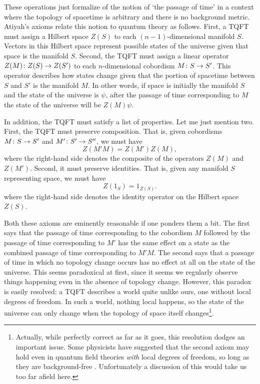 \documentclass[12pt,amsfonts]{article}
\begin{document}
These operations just formalize of the notion of `the passage of
time' in a context where the topology of spacetime is arbitrary and
there is no background metric.    Atiyah's axioms relate this notion to
quantum theory as follows.   First, a TQFT must assign a Hilbert space
$Z(S)$ to each $(n-1)$-dimensional manifold $S$.  Vectors in this
Hilbert space represent possible states of the universe given that space
is the  manifold $S$.  Second, the TQFT must assign a linear operator
$Z(M) \colon Z(S) \rightarrow Z(S')$ to each $n$-dimensional cobordism $M \colon S
\rightarrow S'$.  This operator describes how states change given that the
portion of spacetime between $S$ and $S'$ is the manifold $M$. In other
words, if space is initially the manifold $S$ and the state of  the
universe is $\psi$, after the passage of time corresponding to $M$ the
state of the universe will be $Z(M)\psi$.  

In addition, the TQFT must satisfy a list of properties.  Let me just
mention two.  First, the TQFT must preserve composition.  That is,
given cobordisms $M \colon S \rightarrow S'$ and $M' \colon S' \rightarrow S''$, we must
have 
\[                Z(M'M) = Z(M')Z(M),  \] 
where the right-hand side denotes the composite of the operators
$Z(M)$ and $Z(M')$.  Second, it must preserve identities.  That is, given
 any manifold $S$ representing space, we must have 
\[                Z(1_S) = 1_{Z(S)}  .\] 
where the right-hand side denotes the identity operator on the
Hilbert space $Z(S)$.   

Both these axioms are eminently reasonable if one ponders them a bit. 
The first says that the passage of time corresponding to the cobordism 
$M$ followed by the passage of time corresponding to $M'$ has the  same
effect on a state as the combined passage of time corresponding to
$M'M$.  The second says that a passage of time in which no topology 
change occurs has no effect at all on the state of the universe.  This
seems paradoxical at first, since it seems we regularly observe things 
happening even in the absence of topology change.   However, this
paradox is easily resolved: a TQFT describes a world quite unlike ours,
one without local degrees of freedom.  In such a world, nothing local
happens, so the state of the universe can only change when the topology
of space itself changes\footnote{Actually, while perfectly correct as
far as it goes, this resolution dodges an important issue.  Some
physicists have suggested that the second axiom may hold even in quantum
field theories {\it with} local degrees of freedom, so long as they are
background-free \cite{Barrett}. Unfortunately a discussion of this would
take us too far afield here.}.
\end{document}

